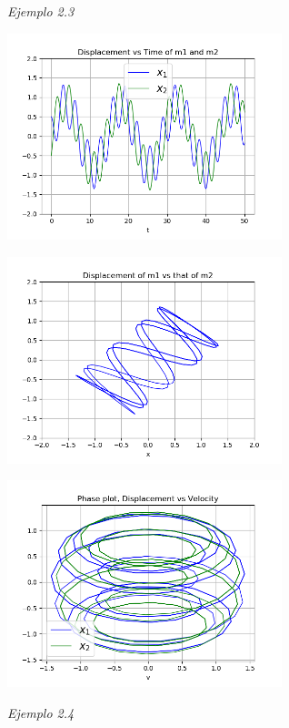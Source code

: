 \documentclass[a4paper]{article}
\begin{document}
\textit{Ejemplo 2.3}

\begin{center}
\includegraphics[height=6cm]{ejemplo2-3.png}

\includegraphics[height=6cm]{recta2-3.png}

\includegraphics[height=6cm]{circulo2-3.png}
\end{center}

\textit{Ejemplo 2.4}
\end{document}
